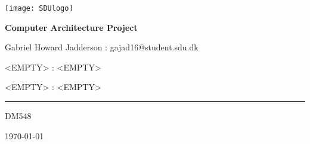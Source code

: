 \begin{titlepage}
	\centering
	\texttt{[image: SDUlogo]}\par\vspace{0.5cm} %
	{\huge\bfseries Computer Architecture Project\par}
	\vspace{0.5cm}
	{\small Gabriel Howard Jadderson : gajad16@student.sdu.dk\par}
	{\small <EMPTY> : <EMPTY>\par}
	{\small <EMPTY> : <EMPTY> \par}
  {\rule{10.0cm}{0.1mm}\par}
	{\small DM548\par}
	{\small \today\par}
	\vspace{1cm}
\end{titlepage}

